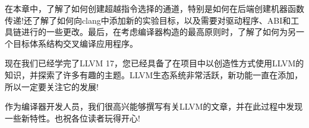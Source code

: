 在本章中，了解了如何创建超越指令选择的通道，特别是如何在后端创建机器函数传递!还了解了如何向clang中添加新的实验目标，以及需要对驱动程序、ABI和工具链进行的一些更改。最后，在考虑编译器构造的最高原则时，了解了如何为另一个目标体系结构交叉编译应用程序。

现在我们已经学完了LLVM 17，您已经具备了在项目中以创造性方式使用LLVM的知识，并探索了许多有趣的主题。LLVM生态系统非常活跃，新功能一直在添加，所以一定要关注它的发展!

作为编译器开发人员，我们很高兴能够撰写有关LLVM的文章，并在此过程中发现一些新特性。也祝各位读者玩得开心!